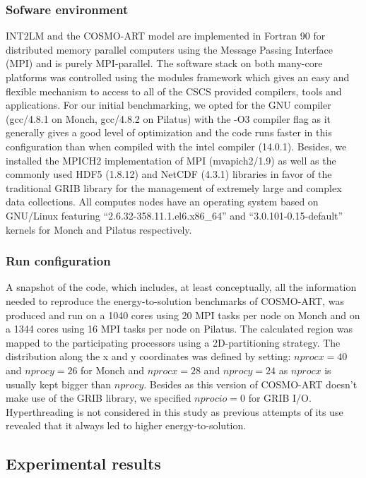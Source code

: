 \subsubsection{Sofware environment}
INT2LM  and the  COSMO-ART model  are  implemented in  Fortran 90  for
distributed  memory  parallel  computers  using  the  Message  Passing
Interface  (MPI) and is  purely MPI-parallel.   The software  stack on
both many-core  platforms was  controlled using the  modules framework
which gives  an easy and  flexible mechanism to  access to all  of the
CSCS  provided compilers,  tools  and applications.   For our  initial
benchmarking,  we opted  for  the GNU  compiler  (gcc/4.8.1 on  Monch,
gcc/4.8.2 on Pilatus) with the -O3 compiler flag as it generally gives
a  good  level  of optimization  and  the  code  runs faster  in  this
configuration  than when  compiled with  the intel  compiler (14.0.1).
Besides, we installed the  MPICH2 implementation of MPI (mvapich2/1.9)
as  well  as  the  commonly  used HDF5  (1.8.12)  and  NetCDF  (4.3.1)
libraries in favor of the  traditional GRIB library for the management
of extremely  large and complex data collections.   All computes nodes
have    an   operating   system    based   on    GNU/Linux   featuring
``2.6.32-358.11.1.el6.x86\_64''  and  ``3.0.101-0.15-default'' kernels
for Monch and Pilatus respectively.

\subsubsection{Run configuration}
A snapshot of the code, which includes, at least conceptually, all the
information needed  to reproduce the  energy-to-solution benchmarks of
COSMO-ART, was produced and run on a 1040 cores using 20 MPI tasks per
node on  Monch and  on a  1344 cores using  16 MPI  tasks per  node on
Pilatus.   The  calculated  region  was mapped  to  the  participating
processors using  a 2D-partitioning strategy.   The distribution along
the  x and  y  coordinates  was defined  by  setting: $nprocx=40$  and
$nprocy=26$ for  Monch and $nprocx=28$ and $nprocy=24$  as $nprocx$ is
usually  kept  bigger  than  $nprocy$.   Besides as  this  version  of
COSMO-ART  doesn't  make  use   of  the  GRIB  library,  we  specified
$nprocio=0$ for  GRIB I/O.  Hyperthreading  is not considered  in this
study as previous  attempts of its use revealed that  it always led to
higher energy-to-solution.\\

\subsection{Experimental results}
\label{subsec:4.3}

